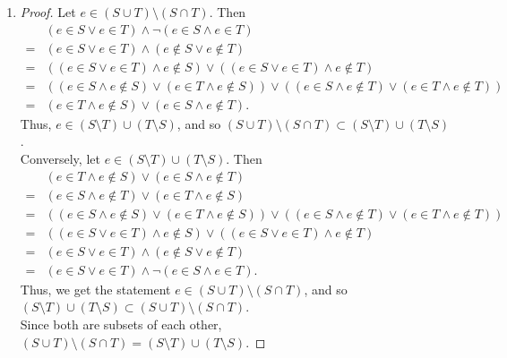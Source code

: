 \documentclass{homework}
\begin{document}
\begin{solution}
\begin{enumerate}[label=(\alph*)]
  \item 
    \begin{proof}[Proof]
      Let $e\in \left( S\cup T \right) \setminus \left( S\cap T \right) $. Then
      \begin{align*}
        &\left( e\in S\lor e\in T \right) \land \neg \left( e\in S\land e\in T \right) \\
        =&\left( e\in S\lor e\in T \right) \land \left( e\not\in S\lor e\not\in T \right) \\
        =&\left( \left( e\in S\lor e\in T \right) \land e\not\in S \right) \lor \left( 
        \left( e\in S\lor e\in T \right)\land e\not\in T\right) \\
        =&\left( \left( e\in S\land e\not\in S \right) \lor \left( e\in T\land e\not\in S \right)
        \right) \lor \left( \left(  e\in S\land e\not\in T \right) \lor \left( e\in T\land e\not\in
      T\right) \right) \\
        =&\left( e\in T\land e\not\in S \right) \lor \left( e\in S\land e\not\in T \right) 
      .\end{align*}
      Thus, $e\in \left( S\setminus T \right) \cup \left( T\setminus S \right) $, and so $\left( S\cup T \right)
      \setminus \left( S\cap T \right) \subset \left( S\setminus T \right) \cup \left( T\setminus S \right) $.\\
      Conversely, let $e\in \left( S\setminus T \right) \cup \left( T\setminus S \right) $. Then
      \begin{align*}
        &\left( e\in T\land e\not\in S \right) \lor \left( e\in S\land e\not\in T \right) \\
        =&\left( e\in S\land e\not\in T \right) \lor \left( e\in T\land e\not\in S \right) \\
        =&\left( \left( e\in S\land e\not\in S \right) \lor \left( e\in T\land e\not\in S \right)
        \right) \lor \left( \left(  e\in S\land e\not\in T \right) \lor \left( e\in T\land e\not\in
      T\right) \right) \\
        =&\left( \left( e\in S\lor e\in T \right) \land e\not\in S \right) \lor \left( 
        \left( e\in S\lor e\in T \right)\land e\not\in T\right) \\
        =&\left( e\in S\lor e\in T \right) \land \left( e\not\in S\lor e\not\in T \right) \\
        =&\left( e\in S\lor e\in T \right) \land \neg \left( e\in S\land e\in T \right)
      .\end{align*}
      Thus, we get the statement 
      $e\in \left( S\cup T \right) \setminus \left( S\cap T\right) $, and so $\left( S\setminus 
      T \right) \cup \left( T\setminus S \right) \subset \left( S\cup T \right) \setminus \left(
    S\cap T \right) $.\\
      Since both are subsets of each other, $\left( S\cup T \right) \setminus \left( S\cap T \right)
      = \left( S\setminus T \right) \cup \left( T\setminus S \right)$.
    \end{proof}
\end{enumerate}


\end{solution}
\end{document}
